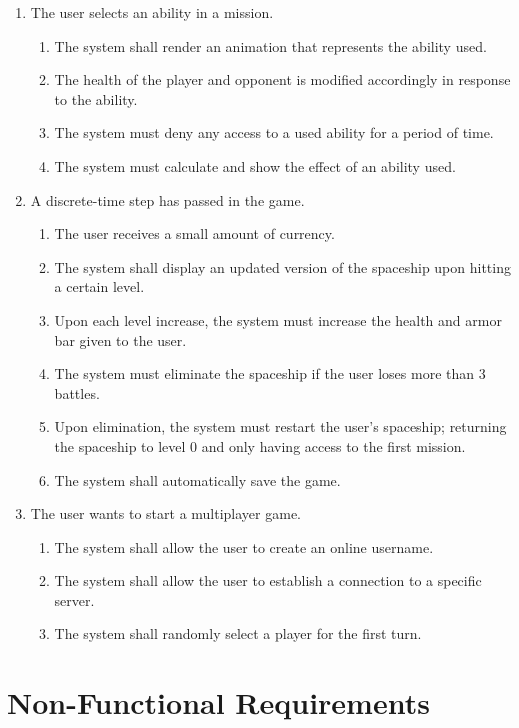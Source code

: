 \documentclass[]{article}
\begin{document}
\begin{enumerate}[{VP}1.]
\begin{enumerate}[{BE1}.1]
		\item The user selects an ability in a mission.
		\begin{enumerate}
		    \item The system shall render an animation that represents the ability used. 
		    \item The health of the player and opponent is modified accordingly in response to the ability.
		    \item The system must deny any access to a used ability for a period of time. 
		    \item The system must calculate and show the effect of an ability used.
		\end{enumerate}
		
		\item A discrete-time step has passed in the game.
		\begin{enumerate}
		    \item The user receives a small amount of currency.
		    \item The system shall display an updated version of the spaceship upon hitting a certain level. 
		    \item Upon each level increase, the system must increase the health and armor bar given to the user. 
		    \item The system must eliminate the spaceship if the user loses more than 3 battles. 
		    \item Upon elimination, the system must restart the user's spaceship; returning the spaceship to level 0 and only having access to the first mission.
		    \item The system shall automatically save the game. 
		   
		\end{enumerate}
		\item The user wants to start a multiplayer game.  
		    \begin{enumerate}
		        \item The system shall allow the user to create an online username.
		        \item The system shall allow the user to establish a connection to a specific server. 
		        \item The system shall randomly select a player for the first turn.  
		    \end{enumerate}
	\end{enumerate}
\end{enumerate}

\section{Non-Functional Requirements}
\label{sec:non-functional_requirements}
\end{document}
